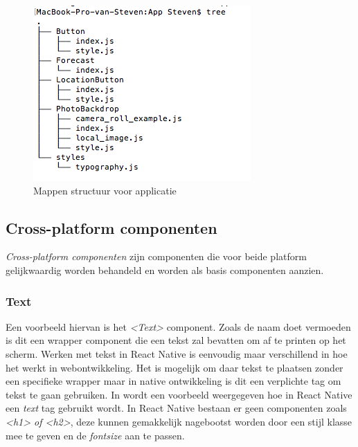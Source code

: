 

\begin{figure}%
\centering
\includegraphics[width=0.5\columnwidth]{img/mappen.png}%
\caption{Mappen structuur voor applicatie}%
\label{fig:mappen}%
\end{figure}

\subsection{Cross-platform componenten}
  
	\emph{Cross-platform componenten} zijn componenten die voor beide platform gelijkwaardig worden behandeld en worden als basis componenten aanzien. 
	\subsubsection{Text}
	Een voorbeeld hiervan is het \emph{<Text>} component. Zoals de naam doet vermoeden is dit een wrapper component die een tekst zal bevatten om af te printen op het scherm. Werken met tekst in React Native is eenvoudig maar verschillend in hoe het werkt in webontwikkeling. Het is mogelijk om daar tekst te plaatsen zonder een specifieke wrapper maar in native ontwikkeling is dit een verplichte tag om tekst te gaan gebruiken. In  wordt een voorbeeld weergegeven hoe in React Native een \emph{text} tag gebruikt wordt. In React Native bestaan er geen componenten zoals \emph{<h1> of <h2>}, deze kunnen gemakkelijk nagebootst worden door een stijl klasse mee te geven en de \emph{fontsize} aan te passen.\citep{api:ReactNative} 
